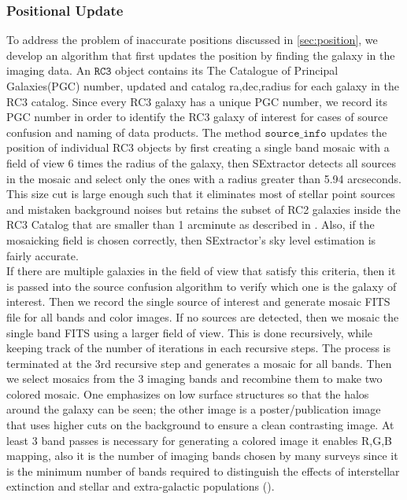 \documentclass[5p]{elsarticle}
\begin{document}
	\subsubsection{Positional Update} 
	To address the problem of inaccurate positions discussed in \autoref{sec:position}, we develop an algorithm that first updates the position by finding the galaxy in the imaging data. An  $\texttt{RC3}$ object contains its The Catalogue of Principal Galaxies(PGC) number, updated and catalog ra,dec,radius for each galaxy in the RC3 catalog. Since every RC3 galaxy has a unique PGC number, we record  its PGC number in order to identify the RC3 galaxy of interest for cases of source confusion and naming of data products. The method $\texttt{source\_info}$ updates the position of individual RC3 objects by first creating a single band mosaic with a field of view 6 times the radius of the galaxy, then SExtractor detects all sources in the mosaic and select only the ones with a radius greater than 5.94 arcseconds. This size cut is large enough such that it eliminates most of stellar point sources and mistaken background noises  but retains the subset of RC2 galaxies inside the RC3 Catalog that are smaller than 1 arcminute as described in \citet{rc2}. Also, if the mosaicking field is chosen correctly, then SExtractor's sky level estimation is fairly accurate.  
\\
\indent If there are multiple galaxies in the field of view that satisfy this criteria, then it is passed into the source confusion algorithm to verify which one is the galaxy of interest. Then we record the single source of interest and generate mosaic FITS file for all bands and color images. If no sources are detected, then we mosaic  the single band FITS using a larger field of view. This is done recursively, while keeping track of the number of iterations in each recursive steps. The process is terminated at the 3rd recursive step and generates a mosaic for all bands. Then we select mosaics from the 3 imaging bands  and recombine them to make two  colored mosaic. \label{sec:best_low}One emphasizes on low surface structures  so that the halos around the galaxy can be seen; the other image is a poster/publication image that uses higher cuts on the background to ensure a clean contrasting image. At least 3 band passes is necessary for generating a colored image it enables  R,G,B mapping, also it is the number of imaging bands chosen by many surveys since it is the minimum number of bands required to distinguish the effects of interstellar extinction and stellar and extra-galactic populations (\citet{2mass}).
\end{document}
